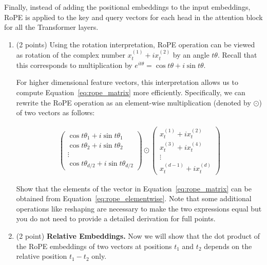 \begin{enumerate}[(a)]
Finally, instead of adding the positional embeddings to the input embeddings, RoPE is applied to the key and query vectors for each head in the attention block for all the Transformer layers.


\begin{enumerate}[label=\roman*.]

\item (2 points) Using the rotation interpretation, RoPE operation can be viewed as rotation of the complex number $x^{(1)}_t + i x^{(2)}_t$ by an angle $t\theta$. Recall that this corresponds to multiplication by $e^{it\theta} = \cos t\theta + i \sin t\theta$.

For higher dimensional feature vectors, this interpretation allows us to compute Equation~\ref{eq:rope_matrix} more efficiently. Specifically, we can rewrite the RoPE operation as an element-wise multiplication (denoted by $\odot$) of two vectors as follows:

\begin{align}\label{eq:rope_elementwise}
    \begin{pmatrix}
        \cos t\theta_1 + i\sin t\theta_1 \\
        \cos t\theta_2 + i\sin t\theta_2 \\
        \vdots \\
        \cos t\theta_{d/2} + i\sin t\theta_{d/2}
    \end{pmatrix}
    \odot
    \begin{pmatrix}
        x^{(1)}_t + i x^{(2)}_t \\
        x^{(3)}_t + i x^{(4)}_t \\
        \vdots \\
        x^{(d-1)}_t + i x^{(d)}_t
    \end{pmatrix}
\end{align}

Show that the elements of the vector in Equation~\ref{eq:rope_matrix} can be obtained from Equation~\ref{eq:rope_elementwise}. Note that some additional operations like reshaping are necessary to make the two expressions equal but you do not need to provide a detailed derivation for full points. 


\item (2 point) \textbf{Relative Embeddings.} Now we will show that the dot product of the RoPE embeddings of two vectors at positions $t_1$ and $t_2$ depends on the relative position $t_1 - t_2$ only. 


\end{enumerate}
\end{enumerate}
